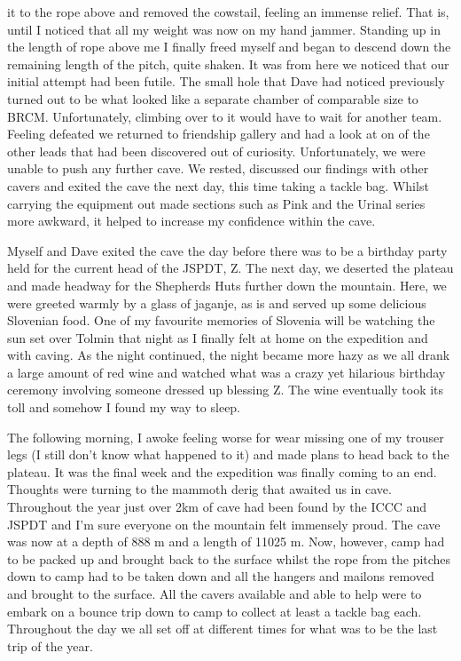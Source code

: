 it to the rope above and removed the cowstail, feeling an immense
relief. That is, until I noticed that all my weight was now on my hand
jammer. Standing up in the length of rope above me I finally freed
myself and began to descend down the remaining length of the pitch,
quite shaken. It was from here we noticed that our initial attempt had
been futile. The small hole that Dave had noticed previously turned out
to be what looked like a separate chamber of comparable size to BRCM.
Unfortunately, climbing over to it would have to wait for another team.
Feeling defeated we returned to friendship gallery and had a look at on
of the other leads that had been discovered out of curiosity.
Unfortunately, we were unable to push any further cave. We rested,
discussed our findings with other cavers and exited the cave the next
day, this time taking a tackle bag. Whilst carrying the equipment out
made sections such as Pink and the Urinal series more awkward, it helped
to increase my confidence within the cave.

Myself and Dave exited the cave the day before there was to be a
birthday party held for the current head of the JSPDT, Z. The next day,
we deserted the plateau and made headway for the Shepherds Huts further
down the mountain. Here, we were greeted warmly by a glass of jaganje,
as is and served up some delicious Slovenian food. One of my favourite
memories of Slovenia will be watching the sun set over Tolmin that night
as I finally felt at home on the expedition and with caving. As the
night continued, the night became more hazy as we all drank a large
amount of red wine and watched what was a crazy yet hilarious birthday
ceremony involving someone dressed up blessing Z. The wine eventually
took its toll and somehow I found my way to sleep.

The following morning, I awoke feeling worse for wear missing one of my
trouser legs (I still don't know what happened to it) and made plans to
head back to the plateau. It was the final week and the expedition was
finally coming to an end. Thoughts were turning to the mammoth derig
that awaited us in cave. Throughout the year just over 2km of cave had
been found by the ICCC and JSPDT and I'm sure everyone on the mountain
felt immensely proud. The cave was now at a depth of 888 m and a length
of 11025 m. Now, however, camp had to be packed up and brought back to
the surface whilst the rope from the pitches down to camp had to be
taken down and all the hangers and mailons removed and brought to the
surface. All the cavers available and able to help were to embark on a
bounce trip down to camp to collect at least a tackle bag each.
Throughout the day we all set off at different times for what was to be
the last trip of the year.

